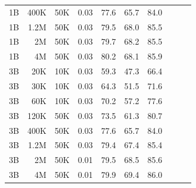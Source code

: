 \begin{table}[h]
\begin{tabulary}{1.0\textwidth}{l r c c c c c c c c}
1B    & 400K  & 50K   & 0.03 & 77.6 & 65.7 & 84.0 \\
1B    & 1.2M  & 50K   & 0.03 & 79.5 & 68.0 & 85.5 \\
1B    & 2M    & 50K   & 0.03 & 79.7 & 68.2 & 85.5 \\
1B    & 4M    & 50K   & 0.03 & 80.2 & 68.1 & 85.9 \\
\midrule[0.25pt]
3B    & 20K   & 10K   & 0.03 & 59.3 & 47.3 & 66.4 \\
3B    & 30K   & 10K   & 0.03 & 64.3 & 51.5 & 71.6 \\
3B    & 60K   & 10K   & 0.03 & 70.2 & 57.2 & 77.6 \\
3B    & 120K  & 50K   & 0.03 & 73.5 & 61.3 & 80.7 \\
3B    & 400K  & 50K   & 0.03 & 77.6 & 65.7 & 84.0 \\
3B    & 1.2M  & 50K   & 0.03 & 79.4 & 67.4 & 85.4 \\
3B    & 2M    & 50K   & 0.01 & 79.5 & 68.5 & 85.6 \\
3B    & 4M    & 50K   & 0.01 & 79.9 & 69.4 & 86.0 \\
    \bottomrule
  \end{tabulary}
\end{table}


